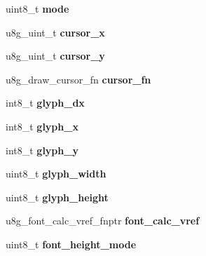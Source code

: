 \begin{DoxyCompactItemize}
\item 
\hypertarget{struct__u8g__t_a8c4feb08ec37909f63041f58d8d99a10}{uint8\-\_\-t {\bfseries mode}}\label{struct__u8g__t_a8c4feb08ec37909f63041f58d8d99a10}

\item 
\hypertarget{struct__u8g__t_af7558c3dd17dfb0f003c51c4eb1912eb}{u8g\-\_\-uint\-\_\-t {\bfseries cursor\-\_\-x}}\label{struct__u8g__t_af7558c3dd17dfb0f003c51c4eb1912eb}

\item 
\hypertarget{struct__u8g__t_a6a9e302798f207c5d39b6da7dd7f22ce}{u8g\-\_\-uint\-\_\-t {\bfseries cursor\-\_\-y}}\label{struct__u8g__t_a6a9e302798f207c5d39b6da7dd7f22ce}

\item 
\hypertarget{struct__u8g__t_aa547fb33883e21fff21061d2526f0c08}{u8g\-\_\-draw\-\_\-cursor\-\_\-fn {\bfseries cursor\-\_\-fn}}\label{struct__u8g__t_aa547fb33883e21fff21061d2526f0c08}

\item 
\hypertarget{struct__u8g__t_a27d47818e331ddd26b67b24270558857}{int8\-\_\-t {\bfseries glyph\-\_\-dx}}\label{struct__u8g__t_a27d47818e331ddd26b67b24270558857}

\item 
\hypertarget{struct__u8g__t_a5583b34b79c56640ec1bc32bfdbc741a}{int8\-\_\-t {\bfseries glyph\-\_\-x}}\label{struct__u8g__t_a5583b34b79c56640ec1bc32bfdbc741a}

\item 
\hypertarget{struct__u8g__t_ac0d8bfa1f6adc4f345783a97bae1bd8e}{int8\-\_\-t {\bfseries glyph\-\_\-y}}\label{struct__u8g__t_ac0d8bfa1f6adc4f345783a97bae1bd8e}

\item 
\hypertarget{struct__u8g__t_ab5b093869ca61ca12f7556827979459d}{uint8\-\_\-t {\bfseries glyph\-\_\-width}}\label{struct__u8g__t_ab5b093869ca61ca12f7556827979459d}

\item 
\hypertarget{struct__u8g__t_ad35e01ae5abe3941e6cd54a467150d98}{uint8\-\_\-t {\bfseries glyph\-\_\-height}}\label{struct__u8g__t_ad35e01ae5abe3941e6cd54a467150d98}

\item 
\hypertarget{struct__u8g__t_a84c2415371436a018222fd7718c04ad4}{u8g\-\_\-font\-\_\-calc\-\_\-vref\-\_\-fnptr {\bfseries font\-\_\-calc\-\_\-vref}}\label{struct__u8g__t_a84c2415371436a018222fd7718c04ad4}

\item 
\hypertarget{struct__u8g__t_a2d77a9d35b4b24072e45f71faa3a4c40}{uint8\-\_\-t {\bfseries font\-\_\-height\-\_\-mode}}\label{struct__u8g__t_a2d77a9d35b4b24072e45f71faa3a4c40}


\end{DoxyCompactItemize}
